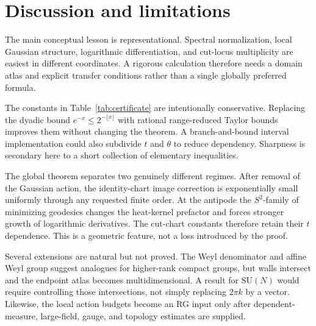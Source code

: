 \section{Discussion and limitations}

The main conceptual lesson is representational.  Spectral normalization,
local Gaussian structure, logarithmic differentiation, and cut-locus
multiplicity are easiest in different coordinates.  A rigorous calculation
therefore needs a domain atlas and explicit transfer conditions rather than a
single globally preferred formula.

The constants in Table~\ref{tab:certificate} are intentionally conservative.
Replacing the dyadic bound $e^{-x}\le2^{-\lfloor x\rfloor}$ with rational
range-reduced Taylor bounds improves them without changing the theorem.  A
branch-and-bound interval implementation could also subdivide $t$ and
$\theta$ to reduce dependency.  Sharpness is secondary here to a short
collection of elementary inequalities.

The global theorem separates two genuinely different regimes.  After removal
of the Gaussian action, the identity-chart image correction is exponentially
small uniformly through any requested finite order.  At the antipode the
$S^2$-family of minimizing geodesics changes the heat-kernel prefactor and
forces stronger growth of logarithmic derivatives.  The cut-chart constants
therefore retain their $t$ dependence.  This is a geometric feature, not a
loss introduced by the proof.

Several extensions are natural but not proved.  The Weyl denominator and
affine Weyl group suggest analogues for higher-rank compact groups, but walls
intersect and the endpoint atlas becomes multidimensional.  A result for
$\mathrm{SU}(N)$ would require controlling those intersections, not simply
replacing $2\pi k$ by a vector.  Likewise, the local action budgets become an
RG input only after dependent-measure, large-field, gauge, and topology
estimates are supplied.

